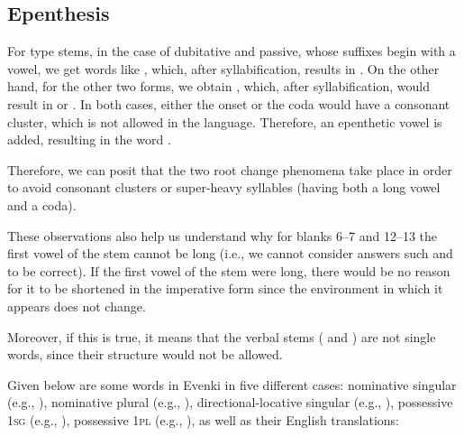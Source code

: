 \begin{refsection}
\begin{discussion}
\subsection*{Epenthesis}

For  type stems, in the case of dubitative and passive, whose suffixes begin with a vowel, we get words like , which, after syllabification, results in . On the other hand, for the other two forms, we obtain , which, after syllabification, would result in  or . In both cases, either the onset or the coda would have a consonant cluster, which is not allowed in the language. Therefore, an epenthetic vowel is added, resulting in the word .

Therefore, we can posit that the two root change phenomena take place in order to avoid consonant clusters or super-heavy syllables (having both a long vowel and a coda).

These observations also help us understand why for blanks 6--7 and 12--13 the first vowel of the stem cannot be long (i.e., we cannot consider answers such  and  to be correct). If the first vowel of the stem were long, there would be no reason for it to be shortened in the imperative form since the environment in which it appears does not change.

Moreover, if this is true, it means that the verbal stems ( and ) are not single words, since their structure would not be allowed.
\end{discussion}

\begin{problem}{\langnameEvenki}{\nameVNeacsu}{\wordoriginal}
Given below are some words in Evenki in five different cases: nominative singular (e.g., ), nominative plural (e.g., ), directional-locative singular (e.g., ), possessive 1\textsc{sg} (e.g., ), possessive 1\textsc{pl} (e.g., ), as well as their English translations:


\end{problem}
\end{refsection}
